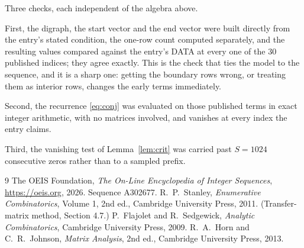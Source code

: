 \documentclass[11pt,a4paper]{article}
\theoremstyle{plain}
\theoremstyle{definition}
\begin{document}
Three checks, each independent of the algebra above.

First, the digraph, the start vector and the end vector were built directly from the
entry's stated condition, the one-row count computed separately, and the resulting values
compared against the entry's DATA at every one of the $30$ published indices; they
agree exactly. This is the check that ties the model to the sequence, and it is a sharp one:
getting the boundary rows wrong, or treating them as interior rows, changes the early terms
immediately.

Second, the recurrence \eqref{eq:conj} was evaluated on those published terms in exact
integer arithmetic, with no matrices involved, and vanishes at every index the entry claims.

Third, the vanishing test of Lemma~\ref{lem:crit} was carried past $S=1024$ consecutive
zeros rather than to a sampled prefix.

\begin{thebibliography}{9}
 The OEIS Foundation, \emph{The On-Line Encyclopedia of Integer
Sequences}, \url{https://oeis.org}, 2026. Sequence A302677.
 R.~P.~Stanley, \emph{Enumerative Combinatorics}, Volume 1, 2nd ed.,
Cambridge University Press, 2011. (Transfer-matrix method, Section 4.7.)
 P.~Flajolet and R.~Sedgewick, \emph{Analytic Combinatorics}, Cambridge
University Press, 2009.
 R.~A.~Horn and C.~R.~Johnson, \emph{Matrix Analysis}, 2nd ed., Cambridge
University Press, 2013.
\end{thebibliography}
\end{document}
